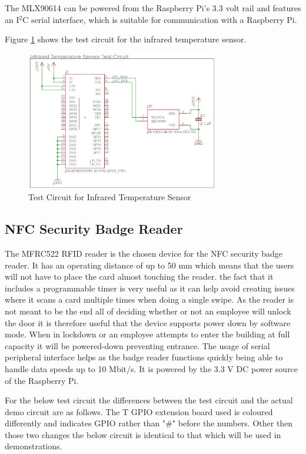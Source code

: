 The MLX90614 can be powered from the Raspberry Pi's 3.3 volt rail and
features an I$^2$C serial interface, which is suitable for communication with a
Raspberry Pi.

Figure \ref{fig:ir-test-circuit} shows the test circuit for the infrared
temperature sensor.

\begin{figure}[!htb]
\centering
\includegraphics[width=0.75\textwidth]{images/ir-test-circuit.png}
\caption{Test Circuit for Infrared Temperature Sensor}
\label{fig:ir-test-circuit}
\end{figure}

\subsection{NFC Security Badge Reader}

The MFRC522 RFID reader is the chosen device for the NFC security badge reader. 
It has an operating distance of up to 50 mm which means that the users will not have to place
the card almost touching the reader. the fact that it includes a programmable timer
is very useful as it can help avoid creating issues where it scans a card multiple times 
when doing a single swipe. As the reader is not meant to be the end all of deciding 
whether or not an employee will unlock the door it is therefore useful that the device
supports power down by software mode. When in lockdown or an employee attempts
to enter the building at full capacity it will be powered-down preventing entrance.  
The usage of serial peripheral interface helps as the badge reader functions quickly 
being able to handle data speeds up to 10 Mbit/s. 
It is powered by the 3.3 V DC power source of the Raspberry Pi.


For the below test circuit the differences between the test circuit and the actual demo circuit
are as follows. The T GPIO extension board used is coloured differently
and indicates GPIO rather than "\#" before the numbers. 
Other then those two changes the below circuit is identical to that which will be used in demonstrations.

